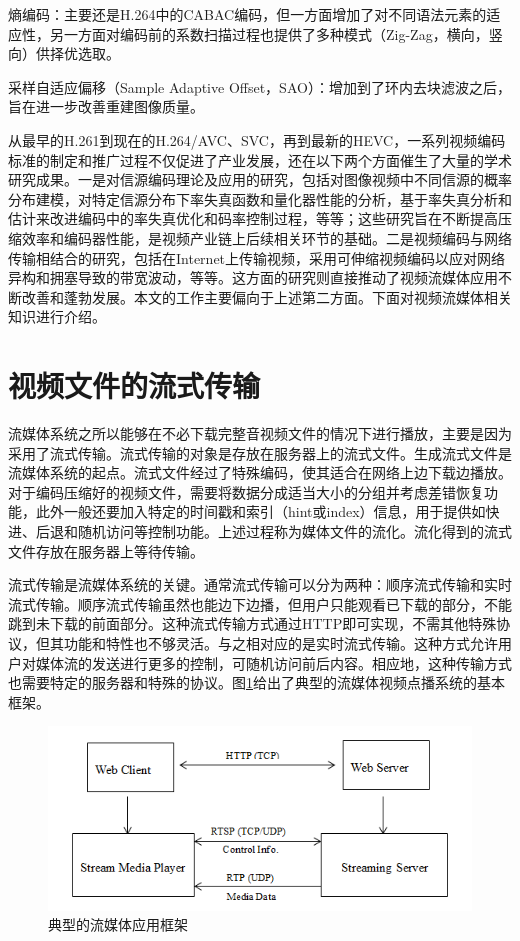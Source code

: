 熵编码：主要还是H.264中的CABAC编码，但一方面增加了对不同语法元素的适应性，另一方面对编码前的系数扫描过程也提供了多种模式（Zig-Zag，横向，竖向）供择优选取。

采样自适应偏移（Sample Adaptive Offset，SAO）：增加到了环内去块滤波之后，旨在进一步改善重建图像质量。

从最早的H.261到现在的H.264/AVC、SVC，再到最新的HEVC，一系列视频编码标准的制定和推广过程不仅促进了产业发展，还在以下两个方面催生了大量的学术研究成果。一是对信源编码理论及应用的研究，包括对图像视频中不同信源的概率分布建模\supercite{Birney-TIP1995, Lam-TIP2000, Sharifi-TCSVT1995, Kamaci-TCSVT2005}，对特定信源分布下率失真函数和量化器性能的分析\supercite{He-TCSVT2001, Gary-TIT1996, Gary-VCIP2005}，基于率失真分析和估计来改进编码中的率失真优化和码率控制过程\supercite{Gary-SPM1998, Lin-TCSVT1998, Sun-TCSVT2006, Lee-TCSVT2014}，等等；这些研究旨在不断提高压缩效率和编码器性能，是视频产业链上后续相关环节的基础。二是视频编码与网络传输相结合的研究\supercite{Sun-book-2001}，包括在Internet上传输视频\supercite{Wu-TCSVT2001, Conklin-TCSVT2001}，采用可伸缩视频编码以应对网络异构和拥塞导致的带宽波动\supercite{Wu-IEEE2001, Ohm-IEEE2005}，等等。这方面的研究则直接推动了视频流媒体应用不断改善和蓬勃发展。本文的工作主要偏向于上述第二方面。下面对视频流媒体相关知识进行介绍。

\section{视频文件的流式传输}

流媒体系统之所以能够在不必下载完整音视频文件的情况下进行播放，主要是因为采用了流式传输。流式传输的对象是存放在服务器上的流式文件。生成流式文件是流媒体系统的起点。流式文件经过了特殊编码，使其适合在网络上边下载边播放。对于编码压缩好的视频文件，需要将数据分成适当大小的分组并考虑差错恢复功能，此外一般还要加入特定的时间戳和索引（hint或index）信息，用于提供如快进、后退和随机访问等控制功能。上述过程称为媒体文件的流化。流化得到的流式文件存放在服务器上等待传输。

流式传输是流媒体系统的关键。通常流式传输可以分为两种：顺序流式传输和实时流式传输。顺序流式传输虽然也能边下边播，但用户只能观看已下载的部分，不能跳到未下载的前面部分。这种流式传输方式通过HTTP即可实现，不需其他特殊协议，但其功能和特性也不够灵活。与之相对应的是实时流式传输。这种方式允许用户对媒体流的发送进行更多的控制，可随机访问前后内容。相应地，这种传输方式也需要特定的服务器和特殊的协议。图\ref{fig:10}给出了典型的流媒体视频点播系统的基本框架。

\begin{figure}[h]
	\centering
	\includegraphics[width = 1.0\linewidth]{clip/10.png}
	\caption{典型的流媒体应用框架\label{fig:10}}
\end{figure}

